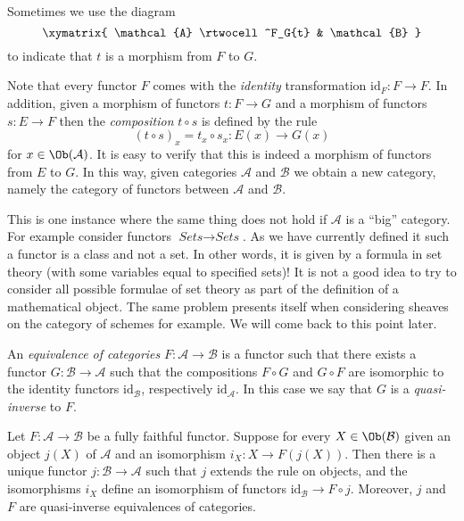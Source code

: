 \noindent
Sometimes we use the diagram
$$
\xymatrix{
\mathcal{A}
\rtwocell^F_G{t}
&
\mathcal{B}
}
$$
to indicate that $t$ is a morphism from $F$ to $G$.

\medskip\noindent
Note that every functor $F$ comes with the {\it identity} transformation
$\text{id}_F : F \to F$. In addition, given a morphism of
functors $t : F \to G$ and a morphism of functors $s : E \to F$
then the {\it composition} $t \circ s$ is defined by the rule
$$
(t \circ s)_x = t_x \circ s_x : E(x) \to G(x)
$$
for $x \in \Ob(\mathcal{A})$.
It is easy to verify that this is indeed a morphism of functors
from $E$ to $G$.
In this way, given categories
$\mathcal{A}$ and $\mathcal{B}$ we obtain a new category,
namely the category of functors between $\mathcal{A}$ and
$\mathcal{B}$.

\begin{remark}
\label{remark-functors-sets-sets}
This is one instance where the same thing does not hold if
$\mathcal{A}$ is a ``big'' category. For example consider
functors $\textit{Sets} \to \textit{Sets}$. As we have currently
defined it such a functor is a class and not a set. In other
words, it is given by a formula in set theory (with some variables
equal to specified sets)! It is not a good idea to try to consider
all possible formulae of set theory as part of the definition of
a mathematical object. The same problem presents itself when
considering sheaves on the category of schemes for example.
We will come back to this point later.
\end{remark}

\begin{definition}
\label{definition-equivalence-categories}
An {\it equivalence of categories}
$F : \mathcal{A} \to \mathcal{B}$ is a functor such that there
exists a functor $G : \mathcal{B} \to \mathcal{A}$ such that
the compositions $F \circ G$ and $G \circ F$ are isomorphic to the
identity functors $\text{id}_\mathcal{B}$,
respectively $\text{id}_\mathcal{A}$.
In this case we say that $G$ is a {\it quasi-inverse} to $F$.
\end{definition}

\begin{lemma}
\label{lemma-construct-quasi-inverse}
Let $F : \mathcal{A} \to \mathcal{B}$ be a fully faithful functor.
Suppose for every $X \in \Ob(\mathcal{B})$ given an
object $j(X)$ of $\mathcal{A}$ and an isomorphism $i_X : X \to F(j(X))$.
Then there is a unique functor $j : \mathcal{B} \to \mathcal{A}$
such that $j$ extends the rule on objects, and the isomorphisms
$i_X$ define an isomorphism of functors
$\text{id}_\mathcal{B} \to F \circ j$. Moreover, $j$ and $F$
are quasi-inverse equivalences of categories.
\end{lemma}

